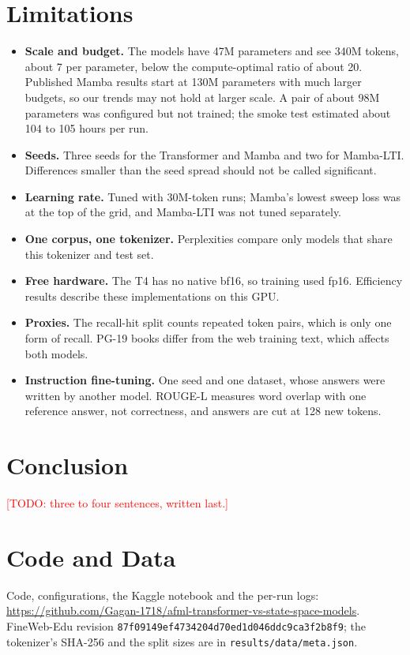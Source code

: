 \documentclass[conference]{IEEEtran}
\newcommand{\todo}[1]{\textcolor{red}{[TODO: #1]}}
\begin{document}
\section{Limitations}
\begin{itemize}
  \item \textbf{Scale and budget.} The models have 47M parameters and see 340M tokens, about 7 per
        parameter, below the compute-optimal ratio of about 20. Published Mamba results start at 130M
        parameters with much larger budgets, so our trends may not hold at larger scale. A pair of about
        98M parameters was configured but not trained; the smoke test estimated about 104 to 105 hours
        per run.
  \item \textbf{Seeds.} Three seeds for the Transformer and Mamba and two for Mamba-LTI. Differences
        smaller than the seed spread should not be called significant.
  \item \textbf{Learning rate.} Tuned with 30M-token runs; Mamba's lowest sweep loss was at the top of
        the grid, and Mamba-LTI was not tuned separately.
  \item \textbf{One corpus, one tokenizer.} Perplexities compare only models that share this tokenizer
        and test set.
  \item \textbf{Free hardware.} The T4 has no native bf16, so training used fp16. Efficiency results
        describe these implementations on this GPU.
  \item \textbf{Proxies.} The recall-hit split counts repeated token pairs, which is only one form of
        recall. PG-19 books differ from the web training text, which affects both models.
  \item \textbf{Instruction fine-tuning.} One seed and one dataset, whose answers were written by
        another model. ROUGE-L measures word overlap with one reference answer, not correctness, and
        answers are cut at 128 new tokens.
\end{itemize}

\section{Conclusion}
\todo{three to four sentences, written last.}

\section*{Code and Data}
Code, configurations, the Kaggle notebook and the per-run logs:
\url{https://github.com/Gagan-1718/afml-transformer-vs-state-space-models}. FineWeb-Edu revision
\texttt{87f09149ef4734204d70ed1d046ddc9ca3f2b8f9}; the tokenizer's SHA-256 and the split sizes are in
\texttt{results/data/meta.json}.
\end{document}
